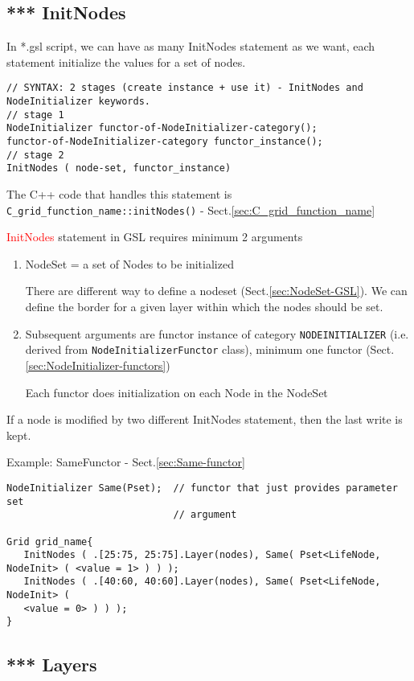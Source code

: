 \subsection{*** InitNodes}
\label{sec:InitNodes}

In *.gsl script, we can have as many InitNodes statement as we want, each
statement initialize the values for a set of nodes.
{\small
\begin{verbatim}
// SYNTAX: 2 stages (create instance + use it) - InitNodes and NodeInitializer keywords.
// stage 1
NodeInitializer functor-of-NodeInitializer-category();
functor-of-NodeInitializer-category functor_instance();
// stage 2
InitNodes ( node-set, functor_instance)
\end{verbatim}
}
The C++ code that handles this statement is
\verb!C_grid_function_name::initNodes()! - Sect.\ref{sec:C_grid_function_name}


\textcolor{red}{InitNodes} statement in GSL requires minimum 2 arguments
\begin{enumerate}
  \item NodeSet = a set of Nodes to be initialized
 
There are different way to define a nodeset (Sect.\ref{sec:NodeSet-GSL}). 
We can define the border for a given layer within which the nodes should be set.  
  
  \item Subsequent arguments are functor instance of category
  \verb!NODEINITIALIZER! (i.e. derived from \verb!NodeInitializerFunctor!
  class), minimum one functor (Sect.\ref{sec:NodeInitializer-functors})
  
  Each functor does initialization on each Node in the NodeSet
\end{enumerate}

If a node is modified by two different InitNodes statement, then the last write
is kept.
 
Example: SameFunctor - Sect.\ref{sec:Same-functor}
\begin{verbatim}
NodeInitializer Same(Pset);  // functor that just provides parameter set
                             // argument

Grid grid_name{
   InitNodes ( .[25:75, 25:75].Layer(nodes), Same( Pset<LifeNode, NodeInit> ( <value = 1> ) ) );
   InitNodes ( .[40:60, 40:60].Layer(nodes), Same( Pset<LifeNode, NodeInit> (
   <value = 0> ) ) );
}
\end{verbatim}  



\subsection{*** Layers}
\label{sec:nts-layer}
\label{sec:layer-gsl-script}



